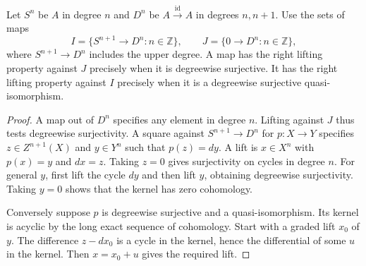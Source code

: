 \begin{proposition}\label{res:Q10}
Let \(S^n\) be \(A\) in degree \(n\) and \(D^n\) be
\(A\xrightarrow{\mathrm{id}} A\) in degrees \(n,n+1\).
Use the sets of maps
\[
 I=\{S^{n+1}\longrightarrow D^n:n\in\mathbb Z\},
 \qquad
 J=\{0\longrightarrow D^n:n\in\mathbb Z\},
\]
where \(S^{n+1}\to D^n\) includes the upper degree. A map has
the right lifting property against \(J\) precisely when it is
degreewise surjective. It has the right lifting property against
\(I\) precisely when it is a degreewise surjective quasi-isomorphism.
\end{proposition}
\begin{proof}
A map out of \(D^n\) specifies any element in degree \(n\).
Lifting against \(J\) thus tests degreewise surjectivity.
A square against \(S^{n+1}\to D^n\) for \(p:X\to Y\) specifies
\(z\in Z^{n+1}(X)\) and \(y\in Y^n\) such that \(p(z)=dy\).
A lift is \(x\in X^n\) with \(p(x)=y\) and \(dx=z\).
Taking \(z=0\) gives surjectivity on cycles in degree \(n\).
For general \(y\), first lift the cycle \(dy\) and then
lift \(y\), obtaining degreewise surjectivity. Taking \(y=0\)
shows that the kernel has zero cohomology.

Conversely suppose \(p\) is degreewise surjective and a
quasi-isomorphism. Its kernel is acyclic by the long exact
sequence of cohomology. Start with a graded lift \(x_0\) of
\(y\). The difference \(z-dx_0\) is a cycle in the kernel,
hence the differential of some \(u\) in the kernel. Then
\(x=x_0+u\) gives the required lift.
\end{proof}

